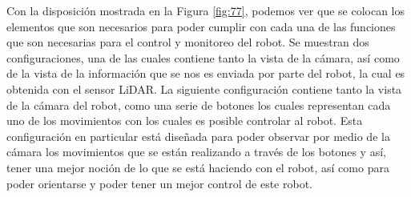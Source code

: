     \vskip 0.5cm
    Con la disposici\'on mostrada en la Figura \ref{fig:77}, podemos ver que se colocan
        los elementos que son necesarios para poder cumplir con
        cada una de las funciones que son necesarias para el control
        y monitoreo del robot. Se muestran dos configuraciones, una
        de las cuales contiene tanto la vista de la c\'amara, as\'i como
        de la vista de la informaci\'on que se nos es enviada por parte
        del robot, la cual es obtenida con el sensor LiDAR. La
        siguiente configuraci\'on contiene tanto la vista de la c\'amara
        del robot, como una serie de botones los cuales representan
        cada uno de los movimientos con los cuales es posible
        controlar al robot. Esta configuraci\'on en particular est\'a
        dise\~nada para poder observar por medio de la c\'amara los
        movimientos que se est\'an realizando a trav\'es de los botones
        y as\'i, tener una mejor noci\'on de lo que se est\'a haciendo con
        el robot, as\'i como para poder orientarse y poder tener un
        mejor control de este robot.